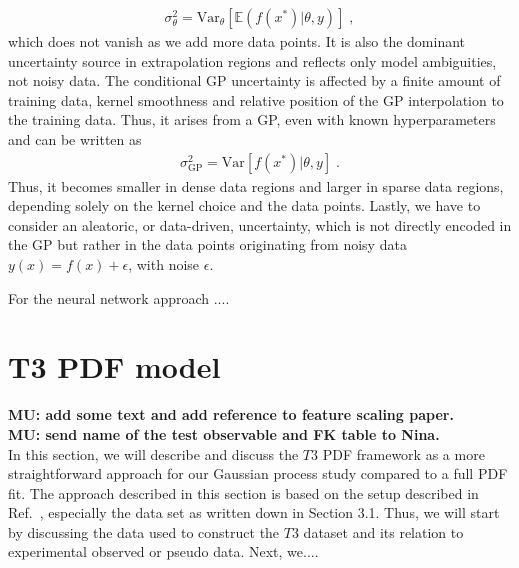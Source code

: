 \documentclass[11pt,a4paper]{article}
\begin{document}
%
\begin{align}
    \sigma^2_\theta = \mathrm{Var}_\theta [\mathbb{E} (f(x^*)|\theta, y)] \; ,
\end{align}
%
which does not vanish as we add more data points. It is also the dominant uncertainty source in extrapolation regions and reflects only model ambiguities, not noisy data. 
The conditional GP uncertainty is affected by a finite amount of training data, kernel smoothness and relative position of the GP interpolation to the training data. Thus, it arises from a GP, even with known hyperparameters and can be written as
%
\begin{align}
    \sigma^2_\text{GP} = \mathrm{Var}[f(x^*)|\theta, y ] \; .
\end{align}
%
Thus, it becomes smaller in dense data regions and larger in sparse data regions, depending solely on the kernel choice and the data points. 
Lastly, we have to consider an aleatoric, or data-driven, uncertainty, which is not directly encoded in the GP but rather in the data points originating from noisy data $y(x) = f(x) + \epsilon$, with noise $\epsilon$.  

For the neural network approach ....
\section{T3 PDF model}
\label{sec:t3model}
%
{\bf MU: add some text and add reference to feature scaling paper. }\\
{\bf MU: send name of the test observable and FK table to Nina. }\\
In this section, we will describe and discuss the $T3$ PDF framework as a more straightforward approach for our Gaussian process study compared to a full PDF fit. The approach described in this section is based on the setup described in Ref.~\cite{Candido:2024hjt}, especially the data set as written down in Section 3.1.
Thus, we will start by discussing the data used to construct the $T3$ dataset and its relation to experimental observed or pseudo data. Next, we....

%
\end{document}
